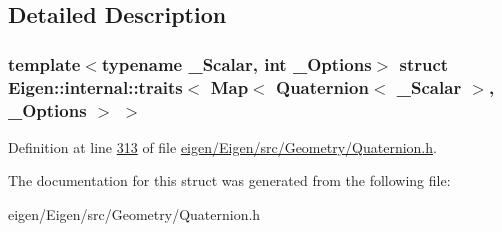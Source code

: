 \subsection{Detailed Description}
\subsubsection*{template$<$typename \+\_\+\+Scalar, int \+\_\+\+Options$>$\newline
struct Eigen\+::internal\+::traits$<$ Map$<$ Quaternion$<$ \+\_\+\+Scalar $>$, \+\_\+\+Options $>$ $>$}



Definition at line \hyperlink{eigen_2_eigen_2src_2_geometry_2_quaternion_8h_source_l00313}{313} of file \hyperlink{eigen_2_eigen_2src_2_geometry_2_quaternion_8h_source}{eigen/\+Eigen/src/\+Geometry/\+Quaternion.\+h}.



The documentation for this struct was generated from the following file\+:\begin{DoxyCompactItemize}
\item 
eigen/\+Eigen/src/\+Geometry/\+Quaternion.\+h\end{DoxyCompactItemize}
